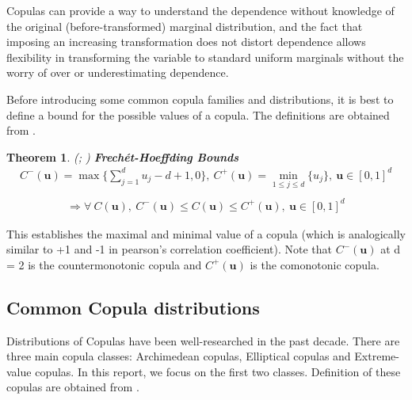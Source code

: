 \documentclass[12pt]{report}
\newtheorem{theorem}{Theorem}[subsection]
\newcommand{\1}{\mathbf{1}}
\begin{document}
\begin{flushleft}
Copulas can provide a way to understand the dependence without knowledge of the original (before-transformed) marginal distribution, and the fact that imposing an increasing transformation does not distort dependence allows flexibility in transforming the variable to standard uniform marginals without the worry of over or underestimating dependence. \\

\vspace{0.5cm}

Before introducing some common copula families and distributions, it is best to define a bound for the possible values of a copula. The definitions are obtained from \cite{HofertBook}. \\ 

\begin{theorem}\label{FrechetHoeffdingBound}
\textit{\normalfont (\cite{höffding1940maßstabinvariante}; \cite{FrechetBounds})}
\:\textbf{Frech\'et-Hoeffding Bounds} \\
\vspace{-0.8cm}
\begin{align*}
C^{-}(\textbf{u}) = \max \{ \sum_{j = 1}^{d} u_{j} - d + 1, 0 \}, \:
C^{+}(\textbf{u}) = \min_{1 \le j \le d} \{u_{j}\}
, \: \textbf{u} \in [0, 1]^d \\
\end{align*}
\vspace{-2.5cm}
\begin{align*}
\Rightarrow \forall \: C(\textbf{u}), \: C^{-}(\textbf{u}) \le C(\textbf{u}) \le C^{+}(\textbf{u}), \: \textbf{u} \in [0, 1]^d
\end{align*}
\end{theorem}

This establishes the maximal and minimal value of a copula (which is analogically similar to +1 and -1 in pearson's correlation coefficient). Note that $C^{-}(\textbf{u})$ at d = 2 is the countermonotonic copula and $C^{+}(\textbf{u})$ is the comonotonic copula.\\


\newpage
\subsection{Common Copula distributions}
\vspace{0.5cm}
Distributions of Copulas have been well-researched in the past decade. There are three main copula classes: Archimedean copulas, Elliptical copulas and Extreme-value copulas. In this report, we focus on the first two classes. Definition of these copulas are obtained from \cite{HofertBook}.

\end{flushleft}
\end{document}
